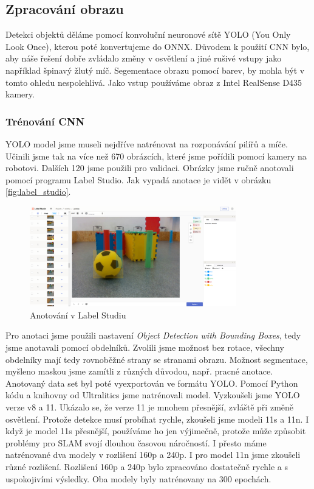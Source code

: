 \documentclass[a4paper,12pt]{article}
\begin{document}
\subsection{Zpracování obrazu}
Detekci objektů děláme pomocí konvoluční neuronové sítě YOLO (You Only Look Once), kterou poté konvertujeme do ONNX. Důvodem k použití CNN bylo, aby náše řešení dobře zvládalo změny v osvětlení a jiné rušivé vstupy jako například špinavý žlutý míč. Segementace obrazu pomocí barev, by mohla být v tomto ohledu nespolehlivá. Jako vstup používáme obraz z Intel RealSense D435 kamery.
\subsubsection{Trénování CNN}
YOLO model jsme museli nejdříve natrénovat na rozponávání pilířů a míče. Učinili jsme tak na více než 670 obrázcích,
které jsme pořídili pomocí kamery na robotovi. Dalších 120 jsme použili pro validaci. Obrázky jsme ručně anotovali pomocí programu Label Studio. Jak vypadá anotace je vidět v obrázku \eqref{fig:label_studio}.
\begin{figure}[H]
    \centering
    \includegraphics[width=0.8\textwidth]{pictures/label_studio.png}
    \caption{Anotování v Label Studiu}
    \label{fig:label_studio}	
\end{figure}
Pro anotaci jsme použili nastavení \textit{Object Detection with Bounding Boxes}, tedy jsme anotavali pomocí obdelníků. Zvolili jsme možnost bez rotace, všechny obdelníky mají tedy rovnoběžné strany se stranami obrazu. 
Možnost segmentace, myšleno maskou jsme zamítli z různých důvodou, např. pracné anotace. 
Anotovaný data set byl poté vyexportován ve formátu YOLO.
Pomocí Python kódu a knihovny od Ultralitics jsme natrénovali model. Vyzkoušeli jsme YOLO verze v8 a 11. Ukázalo se, že verze 11 je mnohem přesnější, zvláště při změně osvětlení. 
Protože detekce musí probíhat rychle, zkoušeli jsme modeli 11s a 11n. I když je model 11s přesnější, používáme ho jen výjimečně, protože může způsobit problémy pro SLAM svojí dlouhou časovou náročností. I přesto máme natrénované dva modely v rozlišení 160p a 240p.
I pro model 11n jsme zkoušeli různé rozlišení. Rozlišení 160p a 240p bylo zpracováno dostatečně rychle a s uspokojivími výsledky. Oba modely byly natrénovany na 300 epochách.
\end{document}
